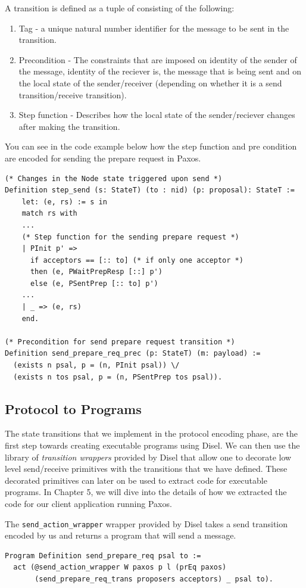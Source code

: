 A transition is defined as a tuple of consisting of the following:
\begin{enumerate}
  \item Tag - a unique natural number identifier for the message to be sent in the transition.
  \item Precondition - The constraints that are imposed on identity of the sender of the message,
    identity of the reciever is, the message that is being sent and on the local state of
    the sender/receiver (depending on whether it is a send transition/receive transition).
  \item Step function - Describes how the local state of the sender/reciever changes after
    making the transition.
\end{enumerate}

You can see in the code example below how the step function and pre condition
are encoded for sending the prepare request in Paxos.

\begin{lstlisting}
(* Changes in the Node state triggered upon send *)
Definition step_send (s: StateT) (to : nid) (p: proposal): StateT :=
    let: (e, rs) := s in
    match rs with
    ...
    (* Step function for the sending prepare request *)
    | PInit p' =>
      if acceptors == [:: to] (* if only one acceptor *)
      then (e, PWaitPrepResp [::] p')
      else (e, PSentPrep [:: to] p')
    ...
    | _ => (e, rs)
    end.

(* Precondition for send prepare request transition *)
Definition send_prepare_req_prec (p: StateT) (m: payload) :=
  (exists n psal, p = (n, PInit psal)) \/
  (exists n tos psal, p = (n, PSentPrep tos psal)).
\end{lstlisting}

\subsection{Protocol to Programs}
The state transitions that we implement in the protocol encoding phase, are the
first step towards creating executable programs using Disel.
We can then use the library of \textit{transition wrappers} provided by Disel
that allow one to decorate low level send/receive primitives with the transitions
that we have defined. These decorated primitives can later on be used to extract
code for executable programs. In Chapter 5, we will dive into the details of
how we extracted the code for our client application running Paxos.

The \texttt{send\_action\_wrapper} wrapper provided by Disel takes a send transition encoded
by us and returns a program that will send a message.
\begin{lstlisting}
Program Definition send_prepare_req psal to :=
  act (@send_action_wrapper W paxos p l (prEq paxos)
       (send_prepare_req_trans proposers acceptors) _ psal to).
\end{lstlisting}

